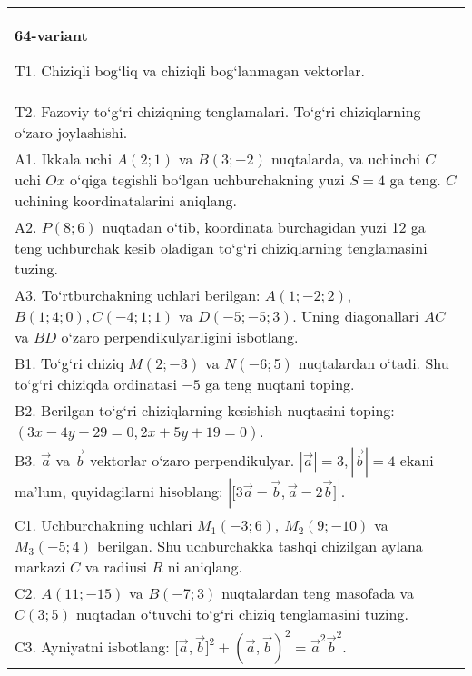 \documentclass{article}
\begin{document}
\begin{tabular}{m{17cm}}
\textbf{64-variant}
\newline

T1. 
Chiziqli bog‘liq va chiziqli bog‘lanmagan vektorlar.
 \\
T2. 
Fazoviy to‘g‘ri chiziqning tenglamalari. To‘g‘ri chiziqlarning o‘zaro joylashishi.
 \\
A1. 
Ikkala uchi $A (2;1) $ va $B (3;-2) $ nuqtalarda, va
uchinchi $C$ uchi $Ox$ o‘qiga tegishli bo‘lgan uchburchakning
yuzi $S=4$ ga teng. $C$ uchining koordinatalarini aniqlang. \\
A2. 
$P (8;6) $ nuqtadan o‘tib, koordinata burchagidan
yuzi 12 ga teng uchburchak kesib oladigan to‘g‘ri chiziqlarning tenglamasini
tuzing.
 \\
A3. 
To‘rtburchakning uchlari berilgan:
$A (1; - 2;2) $, $B (1;4;0),C (- 4;1;1) $ va $D (- 5; -5;3) $. Uning diagonallari $AC$ va $BD$ o‘zaro
perpendikulyarligini isbotlang.
 \\
B1. 
To‘g‘ri chiziq \(M (2;-3) \) va \(N (-6;5) \) nuqtalardan o‘tadi.
Shu to‘g‘ri chiziqda ordinatasi $-5$ ga teng nuqtani toping.
 \\
B2. Berilgan to‘g‘ri chiziqlarning kesishish nuqtasini toping:
$(3x-4y-29=0, 2x+5y+19=0)$.
 \\
B3. 
$\vec{a}$ va $\vec{b}$ vektorlar o‘zaro perpendikulyar. $|\vec{a}| = 3,|\vec{b}| = 4$ ekani ma’lum, quyidagilarni hisoblang:
$|\lbrack 3\vec{a} - \vec{b},\vec{a}-2\vec{b}\rbrack|$.
 \\
C1. 
Uchburchakning uchlari \(M_{1} (- 3;6),\ M_{2} (9; - 10) \)
va \(M_{3} (-5;4) \) berilgan. Shu uchburchakka tashqi chizilgan
aylana markazi $C$ va radiusi $R$ ni aniqlang.
 \\
C2. 
\(A (11; - 15) \) va \(B (-7;3) \) nuqtalardan
teng masofada va \(C (3; 5) \) nuqtadan o‘tuvchi to‘g‘ri chiziq tenglamasini
tuzing.
 \\
C3. 
Ayniyatni isbotlang: \(\lbrack\vec{a},\vec{b}\rbrack^{2} + (\vec{a},\vec{b}) ^{2} = {\vec{a}}^{2}{\vec{b}}^{2}\).
 \\

\end{tabular}
\vspace{1cm}
\end{document}
